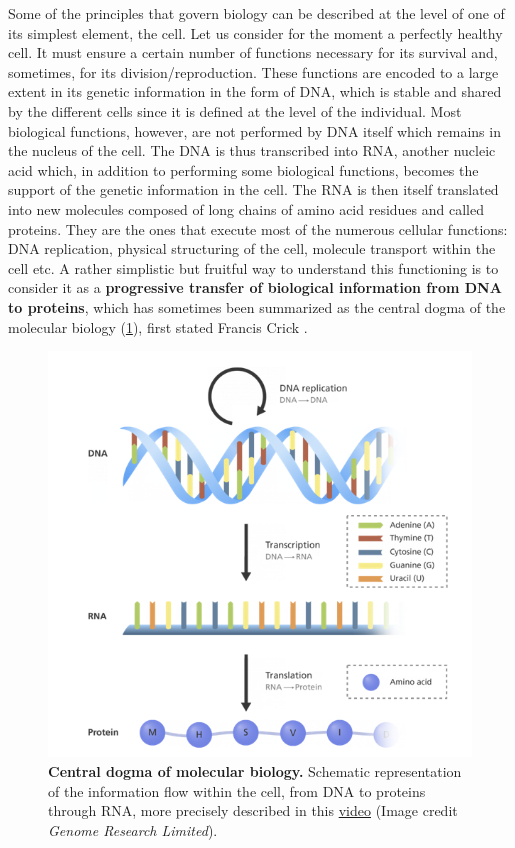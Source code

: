 \documentclass[a4paper,12pt,twoside,onecolumn,openright,final,oldfontcommands]{memoir}
\begin{document}
Some of the principles that govern biology can be described at the level
of one of its simplest element, the cell. Let us consider for the moment
a perfectly healthy cell. It must ensure a certain number of functions
necessary for its survival and, sometimes, for its
division/reproduction. These functions are encoded to a large extent in
its genetic information in the form of DNA, which is stable and shared
by the different cells since it is defined at the level of the
individual. Most biological functions, however, are not performed by DNA
itself which remains in the nucleus of the cell. The DNA is thus
transcribed into RNA, another nucleic acid which, in addition to
performing some biological functions, becomes the support of the genetic
information in the cell. The RNA is then itself translated into new
molecules composed of long chains of amino acid residues and called
proteins. They are the ones that execute most of the numerous cellular
functions: DNA replication, physical structuring of the cell, molecule
transport within the cell etc. A rather simplistic but fruitful way to
understand this functioning is to consider it as a \textbf{progressive
transfer of biological information from DNA to proteins}, which has
sometimes been summarized as the central dogma of the molecular biology
(\ref{fig:central-dogma}), first stated Francis Crick
\citep{crick1970central}.

\begin{figure}

{\centering \includegraphics[width=0.8\linewidth]{fig/central-dogma} 

}

\caption[Central dogma of molecular biology]{\textbf{Central dogma of molecular biology.}
Schematic representation of the information flow within the cell, from
DNA to proteins through RNA, more precisely described in this
\href{https://www.youtube.com/watch?v=J3HVVi2k2No}{video} (Image credit
\emph{Genome Research Limited}).}\label{fig:central-dogma}
\end{figure}
\end{document}
